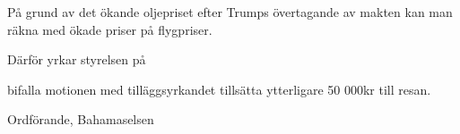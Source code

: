 \documentclass[../_main/handlingar.tex]{subfiles}
\begin{document}
\motionssvar

På grund av det ökande oljepriset efter Trumps övertagande av makten kan man räkna med ökade priser på flygpriser.

Därför yrkar styrelsen på

\begin{attsatser}
    \att bifalla motionen med tilläggsyrkandet
    \att tillsätta ytterligare 50 000kr till resan.
\end{attsatser}

\begin{signatures}{1}
    \ist
    \signature{Fredrik Peterson}{Ordförande, Bahamaselsen}
\end{signatures}
\end{document}
